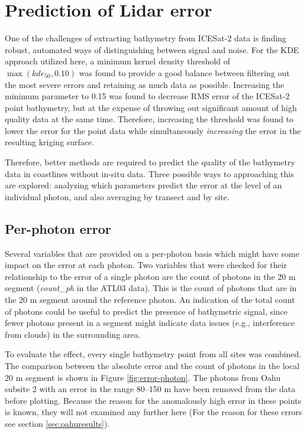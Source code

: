 \section{Prediction of Lidar error}

One of the challenges of extracting bathymetry from ICESat-2 data is finding robust, automated ways of distinguishing between signal and noise. For the KDE approach utilized here, a minimum kernel density threshold of $\max({kde_{50},0.10})$ was found to provide a good balance between filtering out the most severe errors and retaining as much data as possible. Increasing the minimum parameter to 0.15 was found to decrease RMS error of the ICESat-2 point bathymetry, but at the expense of throwing out significant amount of high quality data at the same time. Therefore, increasing the threshold was found to lower the error for the point data while simultaneously \emph{increasing} the error in the resulting kriging surface.

Therefore, better methods are required to predict the quality of the bathymetry data in coastlines without in-situ data. Three possible ways to approaching this are explored: analyzing which parameters predict the error at the level of an individual photon, and also averaging by transect and by site.

\subsection{Per-photon error}
Several variables that are provided on a per-photon basis which might have some impact on the error at each photon. Two variables that were checked for their relationship to the error of a single photon are the count of photons in the 20 m segment (\emph{count\_ph} in the ATL03 data). This is the count of photons that are in the 20 m segment around the reference photon. An indication of the total count of photons could be useful to predict the presence of bathymetric signal, since fewer photons present in a segment might indicate data issues (e.g., interference from clouds) in the surrounding area.

To evaluate the effect, every single bathymetry point from all sites was combined. The comparison between the absolute error and the count of photons in the local 20 m segment is shown in Figure \ref{fig:error-photon}. The photons from Oahu subsite 2 with an error in the range 80--150 m have been removed from the data before plotting. Because the reason for the anomalously high error in these points is known, they will not examined any further here (For the reason for these errors see section \ref{sec:oahuresults}).

